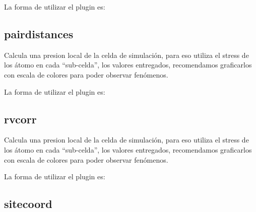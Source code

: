 La forma de utilizar el plugin es:

\subsection{pairdistances}

Calcula una presion local de la celda de simulaci\'on, para eso utiliza el
stress de los \'atomo en cada ``sub-celda'', los valores entregados,
recomendamos graficarlos con escala de colores para poder observar fen\'omenos. 

La forma de utilizar el plugin es:

\subsection{rvcorr}

Calcula una presion local de la celda de simulaci\'on, para eso utiliza el
stress de los \'atomo en cada ``sub-celda'', los valores entregados,
recomendamos graficarlos con escala de colores para poder observar fen\'omenos. 

La forma de utilizar el plugin es:

\subsection{sitecoord}

